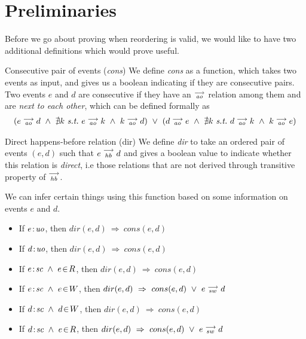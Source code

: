 \section{Preliminaries}
Before we go about proving when reordering is valid, we would like to have two additional definitions which would prove useful.

\begin{definition}{Consecutive pair of events (\emph{cons})}
    \label{Cons}
    We define \emph{cons} as a function, which takes two events as input, and gives us a boolean indicating if they are consecutive pairs. Two events $e$ and $d$ are consecutive if they have an $\stackrel{\longrightarrow}{_\textit{ao}}$ relation among them and are \emph{next to each other}, which can be defined formally as 
        \begin{align*}
            (
            e \stck{_\textit{ao}} d  \ \wedge \ 
            \nexists k \ \textit{s.t.} \ 
            e \stck{_\textit{ao}} k  \ \wedge \
            k \stck{_\textit{ao}} d 
            )
            \ \vee \
            (
                d \stck{_\textit{ao}} e  \ \wedge \ 
                \nexists k \ \textit{s.t.} \ 
                d \stck{_\textit{ao}} k  \ \wedge \
                k \stck{_\textit{ao}} e  
            )
        \end{align*}
\end{definition}

\begin{definition}{Direct happens-before relation (dir)}
    \label{Dir}
    We define \emph{dir} to take an ordered pair of events $(e,d)$ such that $e\stackrel{\longrightarrow}{_{hb}}d$ and gives a boolean value to indicate whether this relation is \textit{direct}, i.e those relations that are not derived through transitive property of $\stackrel{\longrightarrow}{_\textit{hb}}$.
    
    We can infer certain things using this function based on some information on events $e$ and $d$. 
    \begin{itemize}
        \item If $e\!:\!\textit{uo}$, then $dir(e,d) \ \Rightarrow \ cons(e,d)$
        \item If $d\!:\!\textit{uo}$, then $dir(e,d) \ \Rightarrow \ cons(e,d)$
        \item If $\et{e}{sc}\ \wedge\ e\!\in\!R$, then $dir(e,d) \ \Rightarrow \ cons(e,d)$
        \item If $\et{e}{sc}\ \wedge\ e\!\in\!W$, then $dir(e,d) \ \Rightarrow \ cons(e,d)\ \vee\ \reln{e}{sw}{d}$
        \item If $\et{d}{sc}\ \wedge\ d\!\in\!W$, then $dir(e,d) \ \Rightarrow \ cons(e,d)$
        \item If $\et{d}{sc}\ \wedge\ e\!\in\!R$, then $dir(e,d) \ \Rightarrow \ cons(e,d)\ \vee\ \reln{e}{sw}{d}$
    \end{itemize}
\end{definition}


